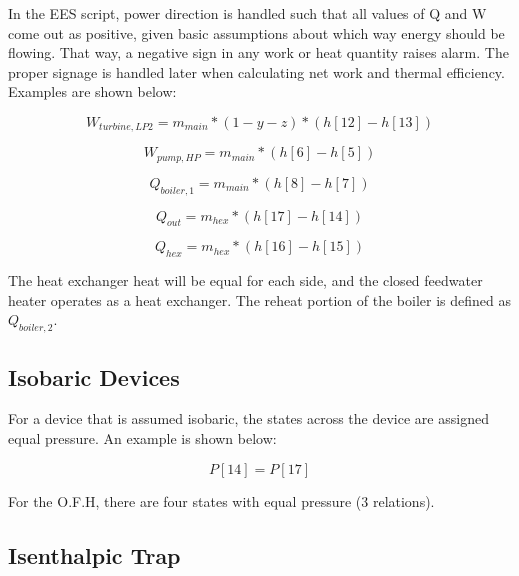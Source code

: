 \documentclass[10pt,cleanfoot]{asme2ej}
\begin{document}
In the EES script, power direction is handled such that all values of Q and W come out as positive, given basic assumptions about which way energy should be flowing. That way, a negative sign in any work or heat quantity raises alarm. The proper signage is handled later when calculating net work and thermal efficiency. Examples are shown below:

\begin{equation}
W_{turbine,LP2} = m_{main} * (1-y-z) * (h[12] - h[13])
\label{Turbine work out}
\end{equation}

\begin{equation}
W_{pump,HP} = m_{main} * (h[6] - h[5])
\label{Pump work in}
\end{equation}

\begin{equation}
Q_{boiler,1} = m_{main} * (h[8] - h[7])
\label{Boiler heat in}
\end{equation}

\begin{equation}
Q_{out} = m_{hex} * (h[17] - h[14])
\label{Condenser heat out}
\end{equation}

\begin{equation}
Q_{hex} = m_{hex} * (h[16] - h[15])
\label{Heat across exchangers}
\end{equation}

The heat exchanger heat will be equal for each side, and the closed feedwater heater operates as a heat exchanger. The reheat portion of the boiler is defined as $Q_{boiler,2}$.

\subsection{Isobaric Devices}

For a device that is assumed isobaric, the states across the device are assigned equal pressure. An example is shown below:

\begin{equation}
P[14] = P[17]
\label{Isobaric device}
\end{equation}

For the O.F.H, there are four states with equal pressure (3 relations).

\subsection{Isenthalpic Trap}
\end{document}
